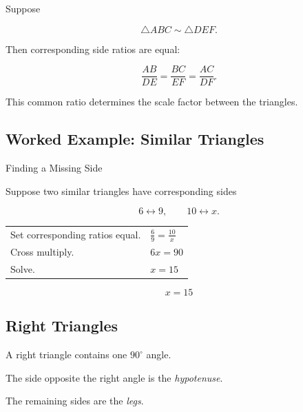 Suppose

\[ \triangle ABC\sim\triangle DEF. \]

Then corresponding side ratios are equal:

\[ \boxed{\frac{AB}{DE}=\frac{BC}{EF}=\frac{AC}{DF}.} \]

This common ratio determines the scale factor between the triangles.

\subsection{Worked Example: Similar Triangles}
\label{subsec:worked-similar-triangles}

\begin{workedexamplebox}{Finding a Missing Side}

Suppose two similar triangles have corresponding sides

\[ 6\leftrightarrow9,\qquad10\leftrightarrow x. \]

\begin{tabularx}{\textwidth}{@{}>{\raggedright\arraybackslash}p{}X@{}}
Set corresponding ratios equal. & \(\frac69=\frac{10}{x}\)\\
Cross multiply. & \(6x=90\)\\
Solve. & \(x=15\)
\end{tabularx}

\begin{answerbox}
\[ \boxed{x=15} \]
\end{answerbox}
\end{workedexamplebox}

\subsection{Right Triangles}
\label{subsec:right-triangles-euclidean}

A right triangle contains one \(90^\circ\) angle.

The side opposite the right angle is the \emph{hypotenuse}.

The remaining sides are the \emph{legs}.

\begin{centereddiagram}
\end{centereddiagram}


